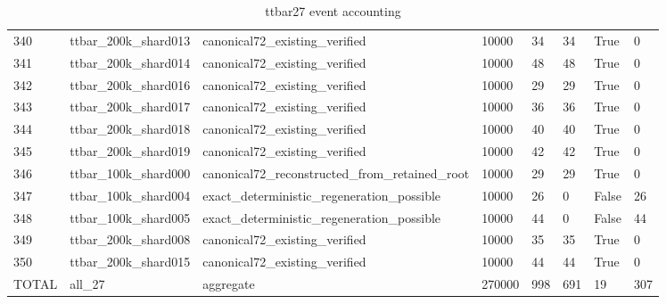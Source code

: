 \begin{table}[htbp]
\begin{tabular}{llllllll}
340 & ttbar\_200k\_shard013 & canonical72\_existing\_verified & 10000 & 34 & 34 & True & 0 \\
341 & ttbar\_200k\_shard014 & canonical72\_existing\_verified & 10000 & 48 & 48 & True & 0 \\
342 & ttbar\_200k\_shard016 & canonical72\_existing\_verified & 10000 & 29 & 29 & True & 0 \\
343 & ttbar\_200k\_shard017 & canonical72\_existing\_verified & 10000 & 36 & 36 & True & 0 \\
344 & ttbar\_200k\_shard018 & canonical72\_existing\_verified & 10000 & 40 & 40 & True & 0 \\
345 & ttbar\_200k\_shard019 & canonical72\_existing\_verified & 10000 & 42 & 42 & True & 0 \\
346 & ttbar\_100k\_shard000 & canonical72\_reconstructed\_from\_retained\_root & 10000 & 29 & 29 & True & 0 \\
347 & ttbar\_100k\_shard004 & exact\_deterministic\_regeneration\_possible & 10000 & 26 & 0 & False & 26 \\
348 & ttbar\_100k\_shard005 & exact\_deterministic\_regeneration\_possible & 10000 & 44 & 0 & False & 44 \\
349 & ttbar\_200k\_shard008 & canonical72\_existing\_verified & 10000 & 35 & 35 & True & 0 \\
350 & ttbar\_200k\_shard015 & canonical72\_existing\_verified & 10000 & 44 & 44 & True & 0 \\
TOTAL & all\_27 & aggregate & 270000 & 998 & 691 & 19 & 307 \\
\bottomrule
\end{tabular}
\caption{ttbar27 event accounting}
\label{tab:ttbar27-event-accounting}
\end{table}
